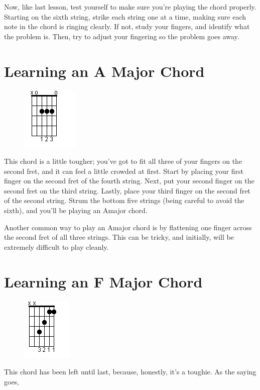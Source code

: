 Now, like last lesson, test yourself to make sure you're playing the chord
properly. Starting on the sixth string, strike each string one at a time,
making sure each note in the chord is ringing clearly. If not, study your
fingers, and identify what the problem is. Then, try to adjust your fingering
so the problem goes away.

\section{Learning an A Major Chord}
\begin{figure}
\includegraphics{partthree/openamajor.png}
\end{figure}

This chord is a little tougher; you've got to fit all three of your fingers on
the second fret, and it can feel a little crowded at first. Start by placing
your first finger on the second fret of the fourth string. Next, put your
second finger on the second fret on the third string. Lastly, place your third
finger on the second fret of the second string. Strum the bottom five strings
(being careful to avoid the sixth), and you'll be playing an Amajor chord.

Another common way to play an Amajor chord is by flattening one finger across
the second fret of all three strings. This can be tricky, and initially, will
be extremely difficult to play cleanly.

\section{Learning an F Major Chord}
\begin{figure}
\includegraphics{partthree/openfmajor.png}
\end{figure}

This chord has been left until last, because, honestly, it's a toughie. As the
saying goes, 

